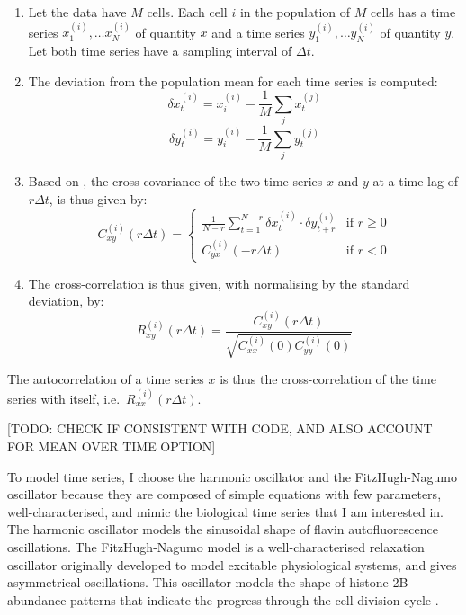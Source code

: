 \begin{enumerate}
  \item Let the data have $M$ cells.
        Each cell $i$ in the population of $M$ cells has a time series $x_{1}^{(i)}, \ldots x_{N}^{(i)}$ of quantity $x$ and a time series $y_{1}^{(i)}, \ldots y_{N}^{(i)}$ of quantity $y$.
        Let both time series have a sampling interval of $\Delta t$.
  \item The deviation from the population mean for each time series is computed:
        \begin{equation}
          \delta x_{t}^{(i)} = x_{i}^{(i)} - \frac{1}{M} \sum_{j}x_{t}^{(j)}
          \label{eq:xcf-dmeans-x}
        \end{equation}
        \begin{equation}
          \delta y_{t}^{(i)} = y_{i}^{(i)} - \frac{1}{M} \sum_{j}y_{t}^{(j)}
          \label{eq:xcf-dmeans-y}
        \end{equation}
  \item Based on \textcite{kivietStochasticityMetabolismGrowth2014}, the cross-covariance of the two time series $x$ and $y$ at a time lag of $r\Delta t$, is thus given by:
        \begin{equation}
          C_{xy}^{(i)}(r\Delta t) =
          \begin{cases}
            \frac{1}{N-r} \sum_{t=1}^{N-r} \delta x_{t}^{(i)} \cdot \delta y_{t+r}^{(i)} & \text{if } r \geq 0 \\
            C_{yx}^{(i)}(-r \Delta t) & \text{if } r < 0
          \end{cases}
          \label{eq:xcf-xcov}
        \end{equation}
    \item The cross-correlation is thus given, with normalising by the standard deviation, by:
        \begin{equation}
          R_{xy}^{(i)}(r \Delta t) = \frac{C_{xy}^{(i)}(r \Delta t)}{\sqrt{C_{xx}^{(i)}(0) C_{yy}^{(i)}(0)}}
          \label{eq:xcf-xcf}
        \end{equation}
\end{enumerate}

The autocorrelation of a time series $x$ is thus the cross-correlation of the time series with itself, i.e.\ $R_{xx}^{(i)}(r \Delta t)$.

[TODO: CHECK IF CONSISTENT WITH CODE, AND ALSO ACCOUNT FOR MEAN OVER TIME OPTION]

To model time series, I choose the harmonic oscillator and the FitzHugh-Nagumo oscillator because they are composed of simple equations with few parameters, well-characterised, and mimic the biological time series that I am interested in.
The harmonic oscillator models the sinusoidal shape of flavin autofluorescence oscillations.
The FitzHugh-Nagumo model \parencite{fitzhughImpulsesPhysiologicalStates1961} is a well-characterised relaxation oscillator originally developed to model excitable physiological systems, and gives asymmetrical oscillations.
This oscillator models the shape of histone 2B abundance patterns that indicate the progress through the cell division cycle \parencite{garmendia-torresMultipleInputsEnsure2018}.

